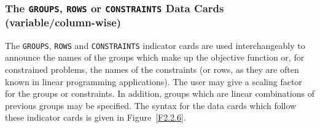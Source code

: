 \documentclass[a4paper]{article}
\begin{document}
\subsubsection{\label{S2.2.6}The {\tt GROUPS}, {\tt ROWS} or
{\tt CONSTRAINTS} Data Cards \protect\\
(variable/\-col\-umn-wise)}
The {\tt GROUPS}, {\tt ROWS} and {\tt CONSTRAINTS}
indicator cards
are used interchangeably to  announce the names of the groups
which  make up   the  objective  function
or, for  constrained
problems, the  names  of the  constraints
(or rows, as  they  are often known in linear programming
applications).  The user may give a  scaling factor for the  groups or
constraints.
In addition,   groups which  are  linear combinations   of
previous groups may be specified. The  syntax for the data cards
which follow these indicator cards
is given in Figure~\ref{F2.2.6}.
\end{document}
